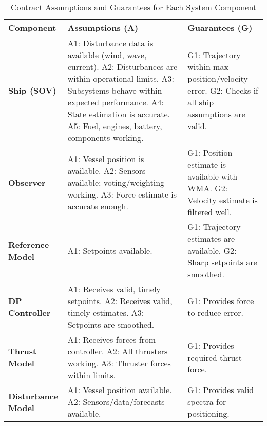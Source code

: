 
\begin{table}[htbp]
\centering
\caption{Contract Assumptions and Guarantees for Each System Component}
\begin{tabular}{|p{2.8cm}|p{5.5cm}|p{5.5cm}|}
\hline
\textbf{Component} & \textbf{Assumptions (A)} & \textbf{Guarantees (G)} \\
\hline
\textbf{Ship (SOV)} &
A1: Disturbance data is available (wind, wave, current). \newline
A2: Disturbances are within operational limits. \newline
A3: Subsystems behave within expected performance. \newline
A4: State estimation is accurate. \newline
A5: Fuel, engines, battery, components working. &
G1: Trajectory within max position/velocity error. \newline
G2: Checks if all ship assumptions are valid. \\
\hline
\textbf{Observer} &
A1: Vessel position is available. \newline
A2: Sensors available; voting/weighting working. \newline
A3: Force estimate is accurate enough. &
G1: Position estimate is available with WMA. \newline
G2: Velocity estimate is filtered well. \\
\hline
\textbf{Reference Model} &
A1: Setpoints available. &
G1: Trajectory estimates are available. \newline
G2: Sharp setpoints are smoothed. \\
\hline
\textbf{DP Controller} &
A1: Receives valid, timely setpoints. \newline
A2: Receives valid, timely estimates. \newline
A3: Setpoints are smoothed. &
G1: Provides force to reduce error. \\
\hline
\textbf{Thrust Model} &
A1: Receives forces from controller. \newline
A2: All thrusters working. \newline
A3: Thruster forces within limits. &
G1: Provides required thrust force. \\
\hline
\textbf{Disturbance Model} &
A1: Vessel position available. \newline
A2: Sensors/data/forecasts available. &
G1: Provides valid spectra for positioning. \\
\hline
\end{tabular}
\label{tab:updated_contracts}
\end{table}
